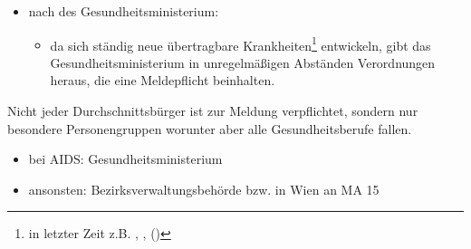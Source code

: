 \begin{itemize}
    \begin{itemize}
        \item {\mdseries
         Meldepflicht erst ab: manifester
        Erkrankung mit AIDS (= bei sichtbaren Krankheitszeichen;
        nicht schon bei HIV-Infektion) oder Todesfall mit
        erkennbaren AIDS typischen Krankheiten\footnote{s.
        }}
        
        \item {\mdseries
        es gibt keine Untersuchungs- oder Behandlungspflicht daher darf kein
        beh\"ordlicher Zwang ausge\"ubt werden}
        
    \end{itemize}
    
    \item {\mdseries
    nach  des Gesundheitsministerium:}
    
    \begin{itemize}
        \item da sich ständig neue \"ubertragbare
        Krankheiten\footnote{in letzter Zeit z.B.
        , , 
        ()} entwickeln, gibt das
        Gesundheitsministerium in unregelmä{\ss}igen  Abständen Verordnungen heraus, die eine Meldepflicht beinhalten.
    \end{itemize}
\end{itemize}


Nicht jeder Durchschnittsb\"urger ist zur Meldung verpflichtet, sondern
nur besondere Personengruppen worunter aber alle Gesundheitsberufe
fallen.


\begin{itemize}
    
    \item {\mdseries
    bei AIDS: Gesundheitsministerium}
    
    \item {\mdseries
    ansonsten: Bezirksverwaltungsbeh\"orde bzw. in Wien an MA 15}
    
\end{itemize}




